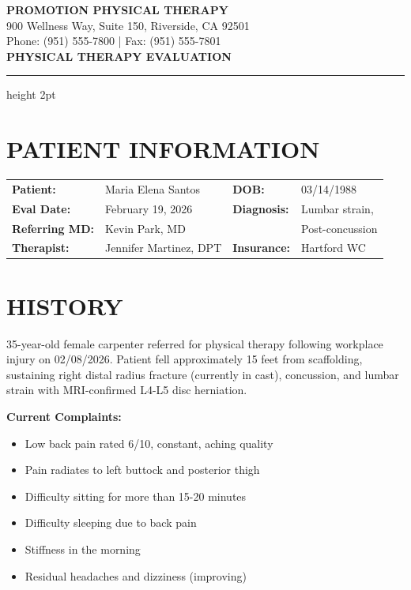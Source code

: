 \documentclass[11pt]{article}
\begin{document}
\begin{center}
{\Large\bfseries\color{ptgreen} PROMOTION PHYSICAL THERAPY}\\[0.3em]
{\small 900 Wellness Way, Suite 150, Riverside, CA 92501}\\
{\small Phone: (951) 555-7800 | Fax: (951) 555-7801}\\[1em]
{\LARGE\bfseries PHYSICAL THERAPY EVALUATION}
\end{center}

\vspace{0.5em}
\hrule height 2pt
\vspace{1em}

\section*{PATIENT INFORMATION}

\begin{tabular}{@{}p{3.5cm}p{5cm}p{3cm}p{4cm}@{}}
\textbf{Patient:} & Maria Elena Santos & \textbf{DOB:} & 03/14/1988 \\
\textbf{Eval Date:} & February 19, 2026 & \textbf{Diagnosis:} & Lumbar strain, \\
\textbf{Referring MD:} & Kevin Park, MD & & Post-concussion \\
\textbf{Therapist:} & Jennifer Martinez, DPT & \textbf{Insurance:} & Hartford WC \\
\end{tabular}

\section*{HISTORY}

35-year-old female carpenter referred for physical therapy following workplace injury on 02/08/2026. Patient fell approximately 15 feet from scaffolding, sustaining right distal radius fracture (currently in cast), concussion, and lumbar strain with MRI-confirmed L4-L5 disc herniation.

\textbf{Current Complaints:}
\begin{itemize}[nosep]
\item Low back pain rated 6/10, constant, aching quality
\item Pain radiates to left buttock and posterior thigh
\item Difficulty sitting for more than 15-20 minutes
\item Difficulty sleeping due to back pain
\item Stiffness in the morning
\item Residual headaches and dizziness (improving)
\end{itemize}
\end{document}
